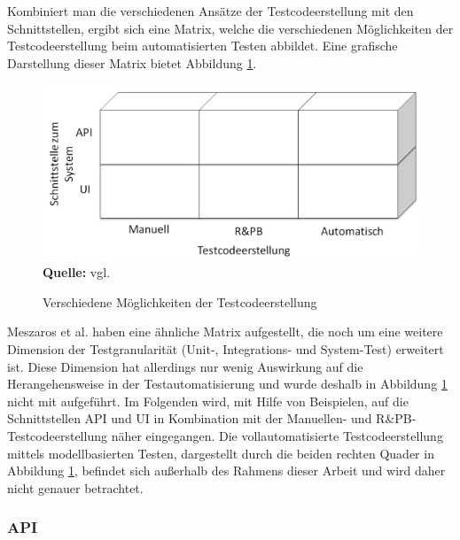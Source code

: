 Kombiniert man die verschiedenen Ansätze der Testcodeerstellung mit den Schnittstellen, ergibt sich eine Matrix, welche die verschiedenen Möglichkeiten der Testcodeerstellung beim automatisierten Testen abbildet. Eine grafische Darstellung dieser Matrix bietet Abbildung \ref{fig:bereicheTestcodeerstellung}.


\begin{figure}[htb]
  \centering  
  \includegraphics[scale=0.7]{img/bereicheTestcodeerstellung.png}\\
  \footnotesize\sffamily\textbf{Quelle:} vgl. \cite{meszaros_agile_2003}
  \caption{Verschiedene Möglichkeiten der Testcodeerstellung}
  \label{fig:bereicheTestcodeerstellung}
\end{figure}

Meszaros et al. \cite{meszaros_agile_2003} haben eine ähnliche Matrix aufgestellt, die noch um eine weitere Dimension der Testgranularität (Unit-, Integrations- und System-Test) erweitert ist. Diese Dimension hat allerdings nur wenig Auswirkung auf die Herangehensweise in der Testautomatisierung und wurde deshalb in Abbildung \ref{fig:bereicheTestcodeerstellung} nicht mit aufgeführt.
Im Folgenden wird, mit Hilfe von Beispielen, auf die Schnittstellen API und UI in Kombination mit der Manuellen- und R\&PB-Testcodeerstellung näher eingegangen.
Die vollautomatisierte Testcodeerstellung mittels modellbasierten Testen, dargestellt durch die beiden rechten Quader in Abbildung \ref{fig:bereicheTestcodeerstellung}, befindet sich außerhalb des Rahmens dieser Arbeit und wird daher nicht genauer betrachtet.

\subsubsection{API}
\label{subsubsec:API}

